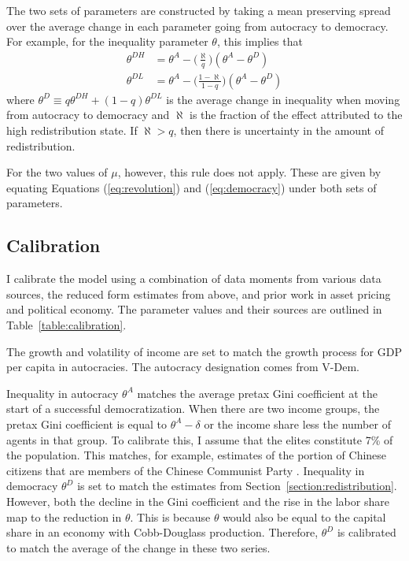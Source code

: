 The two sets of parameters are constructed by taking a mean preserving spread over the average change in each parameter going from autocracy to democracy. For example, for the inequality parameter $\theta$, this implies that
\begin{align*}
\theta^{DH} & = \theta^A - \bigg(\frac{\aleph}{q}\bigg)(\theta^A-\theta^D) \\
\theta^{DL} & = \theta^A - \bigg(\frac{1-\aleph}{1-q}\bigg)(\theta^A-\theta^D) 
\end{align*}
where $\theta^D \equiv q \theta^{DH} + (1-q)\theta^{DL}$ is the average change in inequality when moving from autocracy to democracy and $\aleph$ is the fraction of the effect attributed to the high redistribution state. If $\aleph > q$, then there is uncertainty in the amount of redistribution. 

For the two values of $\mu$, however, this rule does not apply. These are given by equating Equations (\ref{eq:revolution}) and (\ref{eq:democracy}) under both sets of parameters.

\subsection{Calibration}



I calibrate the model using a combination of data moments from various data sources, the reduced form estimates from above, and prior work in asset pricing and political economy. The parameter values and their sources are outlined in Table~\ref{table:calibration}.

The growth and volatility of income are set to match the growth process for GDP per capita in autocracies. The autocracy designation comes from V-Dem. 

Inequality in autocracy $\theta^A$ matches the average pretax Gini coefficient at the start of a successful democratization. When there are two income groups, the pretax Gini coefficient is equal to $\theta^A-\delta$ or the income share less the number of agents in that group.  To calibrate this, I assume that the elites constitute 7\% of the population. This matches, for example, estimates of the portion of Chinese citizens that are members of the Chinese Communist Party \citep{Tian2021}. Inequality in democracy $\theta^D$ is set to match the estimates from Section~\ref{section:redistribution}. However, both the decline in the Gini coefficient and the rise in the labor share map to the reduction in $\theta$. This is because  $\theta$ would also be equal to the capital share in an economy with Cobb-Douglass production. Therefore, $\theta^D$ is calibrated to match the average of the change in these two series. 

